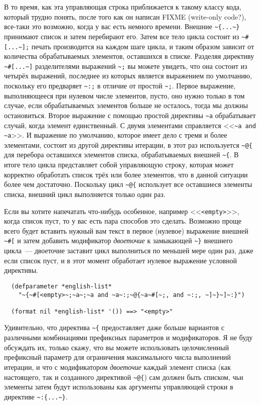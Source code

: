 В то время, как эта управляющая строка приближается к такому классу кода, который трудно понять, после того как
он написан FIXME (write-only code?), все-таки это возможно, когда у вас есть немного времени. Внешние
\lstinline!~{...~}! принимают список и затем перебирают его. Затем все тело цикла состоит из \lstinline!~#[...~];! печать
производится на каждом шаге цикла, и таким образом зависит от количества обрабатываемых элементов, оставшихся в
списке. Разделяя директиву \lstinline!~#[...~]! разделителями выражений \lstinline!~;! вы можете увидеть, что она состоит из
четырёх выражений, последнее из которых является выражением по умолчанию, поскольку его предваряет \lstinline!~:;! в
отличие от простой \lstinline!~;!. Первое выражение, выполняющееся при нулевом числе элементов, пусто, оно нужно только
в том случае, если обрабатываемых элементов больше не осталось, тогда мы должны остановиться. Второе выражение с
помощью простой директивы \lstinline!~a! обрабатывает случай, когда элемент единственный. С двумя элементами справляется
<<\lstinline!~a and ~a!>>. И выражение по умолчанию, которое имеет дело с тремя и более элементами, состоит из другой
директивы итерации, в этот раз используется \lstinline!~@{! для перебора оставшихся элементов списка, обрабатываемых внешней
\lstinline!~{!. В итоге тело цикла представляет собой управляющую строку, которая может корректно обработать список трёх
или более элементов, что в данной ситуации более чем достаточно. Поскольку цикл \lstinline!~@{! использует все
оставшиеся элементы списка, внешний цикл выполняется только один раз.

Если вы хотите напечатать что-нибудь особенное, например <<\lstinline!<empty>!>>, когда
список пуст, то у вас есть пара способов это сделать. Возможно проще всего будет вставить
нужный вам текст в первое (нулевое) выражение внешней \lstinline!~#[! и затем добавить
модификатор \textit{двоеточие} к замыкающей \lstinline!~}! внешнего цикла~--- двоеточие
заставит цикл выполниться по меньшей мере один раз, даже если список пуст, и в этот момент
 обработает нулевое выражение условной директивы.

\begin{verbatim}
  (defparameter *english-list*
    "~{~#[<empty>~;~a~;~a and ~a~:;~@{~a~#[~;, and ~:;, ~]~}~]~:}")

  (format nil *english-list* '()) ==> "<empty>"
\end{verbatim}

Удивительно, что директива \lstinline!~{! предоставляет даже больше вариантов с различными комбинациями префиксных
параметров и модификаторов. Я не буду обсуждать их, только скажу, что вы можете использовать целочисленный
префиксный параметр для ограничения максимального числа выполнений итерации, и что с модификатором \textit{двоеточие}
каждый элемент списка (как настоящего, так и созданного директивой \lstinline!~@{!) сам должен быть списком, чьи
элементы затем будут использованы как аргументы управляющей строки в директиве \lstinline!~:{...~}!.

